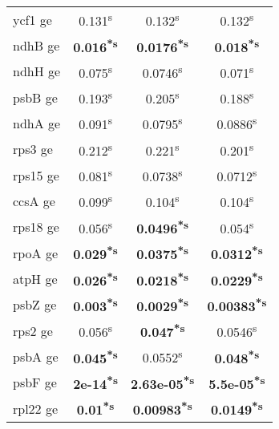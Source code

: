 \documentclass[a4paper]{article}
\begin{document}
\begin{longtable}{l|c|c|c}
ycf1 ge&0.131\textsuperscript{s}&0.132\textsuperscript{s}&0.132\textsuperscript{s}\\
ndhB ge&\textbf{0.016\textsuperscript{*}\textsuperscript{s}}&\textbf{0.0176\textsuperscript{*}\textsuperscript{s}}&\textbf{0.018\textsuperscript{*}\textsuperscript{s}}\\
ndhH ge&0.075\textsuperscript{s}&0.0746\textsuperscript{s}&0.071\textsuperscript{s}\\
psbB ge&0.193\textsuperscript{s}&0.205\textsuperscript{s}&0.188\textsuperscript{s}\\
ndhA ge&0.091\textsuperscript{s}&0.0795\textsuperscript{s}&0.0886\textsuperscript{s}\\
rps3 ge&0.212\textsuperscript{s}&0.221\textsuperscript{s}&0.201\textsuperscript{s}\\
rps15 ge&0.081\textsuperscript{s}&0.0738\textsuperscript{s}&0.0712\textsuperscript{s}\\
ccsA ge&0.099\textsuperscript{s}&0.104\textsuperscript{s}&0.104\textsuperscript{s}\\
rps18 ge&0.056\textsuperscript{s}&\textbf{0.0496\textsuperscript{*}\textsuperscript{s}}&0.054\textsuperscript{s}\\
rpoA ge&\textbf{0.029\textsuperscript{*}\textsuperscript{s}}&\textbf{0.0375\textsuperscript{*}\textsuperscript{s}}&\textbf{0.0312\textsuperscript{*}\textsuperscript{s}}\\
atpH ge&\textbf{0.026\textsuperscript{*}\textsuperscript{s}}&\textbf{0.0218\textsuperscript{*}\textsuperscript{s}}&\textbf{0.0229\textsuperscript{*}\textsuperscript{s}}\\
psbZ ge&\textbf{0.003\textsuperscript{*}\textsuperscript{s}}&\textbf{0.0029\textsuperscript{*}\textsuperscript{s}}&\textbf{0.00383\textsuperscript{*}\textsuperscript{s}}\\
rps2 ge&0.056\textsuperscript{s}&\textbf{0.047\textsuperscript{*}\textsuperscript{s}}&0.0546\textsuperscript{s}\\
psbA ge&\textbf{0.045\textsuperscript{*}\textsuperscript{s}}&0.0552\textsuperscript{s}&\textbf{0.048\textsuperscript{*}\textsuperscript{s}}\\
psbF ge&\textbf{2e-14\textsuperscript{*}\textsuperscript{s}}&\textbf{2.63e-05\textsuperscript{*}\textsuperscript{s}}&\textbf{5.5e-05\textsuperscript{*}\textsuperscript{s}}\\
rpl22 ge&\textbf{0.01\textsuperscript{*}\textsuperscript{s}}&\textbf{0.00983\textsuperscript{*}\textsuperscript{s}}&\textbf{0.0149\textsuperscript{*}\textsuperscript{s}}\\

\end{longtable}
\end{document}
